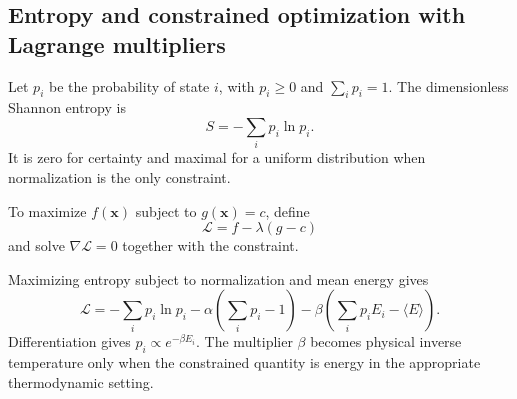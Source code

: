 \subsection{Entropy and constrained optimization with Lagrange multipliers}
\label{math:constraints}

Let $p_i$ be the probability of state $i$, with $p_i\geq0$ and $\sum_i p_i=1$.
The dimensionless Shannon entropy is
\[
    S=-\sum_i p_i\ln p_i.
\]
It is zero for certainty and maximal for a uniform distribution when normalization is the only constraint.

To maximize $f(\mathbf{x})$ subject to $g(\mathbf{x})=c$, define
\[
    \mathcal{L}=f-\lambda(g-c)
\]
and solve $\nabla\mathcal{L}=0$ together with the constraint.

Maximizing entropy subject to normalization and mean energy gives
\[
    \mathcal{L}=-\sum_i p_i\ln p_i-\alpha\left(\sum_i p_i-1\right)-\beta\left(\sum_i p_iE_i-\langle E\rangle\right).
\]
Differentiation gives $p_i\propto e^{-\beta E_i}$.
The multiplier $\beta$ becomes physical inverse temperature only when the constrained quantity is energy in the appropriate thermodynamic setting.

